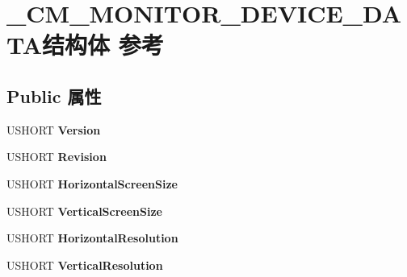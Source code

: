 \hypertarget{struct___c_m___m_o_n_i_t_o_r___d_e_v_i_c_e___d_a_t_a}{}\section{\+\_\+\+C\+M\+\_\+\+M\+O\+N\+I\+T\+O\+R\+\_\+\+D\+E\+V\+I\+C\+E\+\_\+\+D\+A\+T\+A结构体 参考}
\label{struct___c_m___m_o_n_i_t_o_r___d_e_v_i_c_e___d_a_t_a}
\subsection*{Public 属性}
\begin{DoxyCompactItemize}
\item 
\mbox{\label{struct___c_m___m_o_n_i_t_o_r___d_e_v_i_c_e___d_a_t_a_a11957ee60f42798062e81abf547d5671}} 
U\+S\+H\+O\+RT {\bfseries Version}
\item 
\mbox{\label{struct___c_m___m_o_n_i_t_o_r___d_e_v_i_c_e___d_a_t_a_a13dabe66d01664d19adf3936b29ccaa5}} 
U\+S\+H\+O\+RT {\bfseries Revision}
\item 
\mbox{\label{struct___c_m___m_o_n_i_t_o_r___d_e_v_i_c_e___d_a_t_a_aad5268380cab6ce38bf604fcaf74dfc2}} 
U\+S\+H\+O\+RT {\bfseries Horizontal\+Screen\+Size}
\item 
\mbox{\label{struct___c_m___m_o_n_i_t_o_r___d_e_v_i_c_e___d_a_t_a_a795ec71aa95db3005ba7729f5108f075}} 
U\+S\+H\+O\+RT {\bfseries Vertical\+Screen\+Size}
\item 
\mbox{\label{struct___c_m___m_o_n_i_t_o_r___d_e_v_i_c_e___d_a_t_a_aea9932919c2734c8d2ba0951cfb607dc}} 
U\+S\+H\+O\+RT {\bfseries Horizontal\+Resolution}
\item 
\mbox{\label{struct___c_m___m_o_n_i_t_o_r___d_e_v_i_c_e___d_a_t_a_ae5251f47635c62cbd228494d0bbe0220}} 
U\+S\+H\+O\+RT {\bfseries Vertical\+Resolution}
\item 

\end{DoxyCompactItemize}
